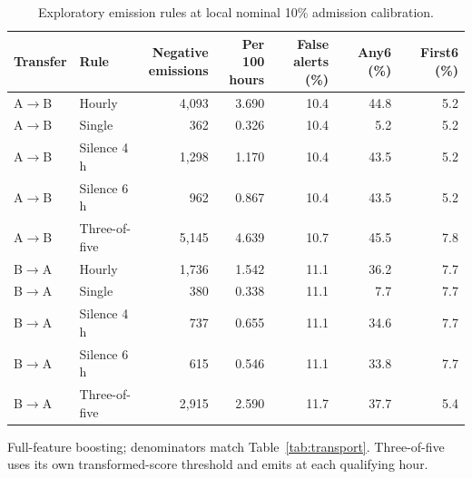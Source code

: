 \begin{table}[tbp]
\centering
\footnotesize
\setlength{\tabcolsep}{4pt}
\renewcommand{\arraystretch}{1.18}
\caption{Exploratory emission rules at local nominal 10\% admission calibration.}\label{tab:policies}
\begin{tabular}{llrrrrr}
\toprule
Transfer & Rule & \makecell{Negative\\{}emissions} & \makecell{Per 100\\{}hours} & \makecell{False\\{}alerts (\%)} & Any6 (\%) & First6 (\%) \\
\midrule
A$\to$B & Hourly & 4,093 & 3.690 & 10.4 & 44.8 & 5.2 \\
A$\to$B & Single & 362 & 0.326 & 10.4 & 5.2 & 5.2 \\
A$\to$B & Silence 4 h & 1,298 & 1.170 & 10.4 & 43.5 & 5.2 \\
A$\to$B & Silence 6 h & 962 & 0.867 & 10.4 & 43.5 & 5.2 \\
A$\to$B & Three-of-five & 5,145 & 4.639 & 10.7 & 45.5 & 7.8 \\
B$\to$A & Hourly & 1,736 & 1.542 & 11.1 & 36.2 & 7.7 \\
B$\to$A & Single & 380 & 0.338 & 11.1 & 7.7 & 7.7 \\
B$\to$A & Silence 4 h & 737 & 0.655 & 11.1 & 34.6 & 7.7 \\
B$\to$A & Silence 6 h & 615 & 0.546 & 11.1 & 33.8 & 7.7 \\
B$\to$A & Three-of-five & 2,915 & 2.590 & 11.7 & 37.7 & 5.4 \\
\bottomrule
\end{tabular}
\par\vspace{3pt}\begin{minipage}{\linewidth}\footnotesize Full-feature boosting; denominators match Table~\ref{tab:transport}. Three-of-five uses its own transformed-score threshold and emits at each qualifying hour.\end{minipage}
\end{table}
